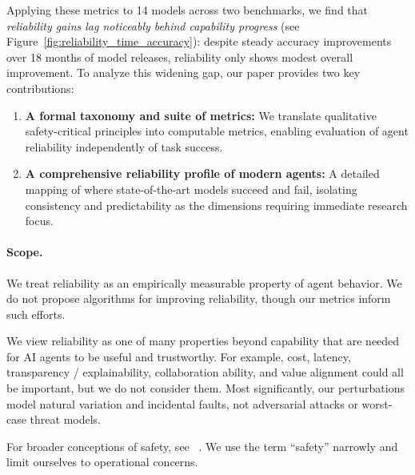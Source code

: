 \documentclass[11pt]{article}
\newcounter{dimension}
\begin{document}
Applying these metrics to 14 models across two benchmarks, we find that \textit{reliability gains lag noticeably behind capability progress} (see Figure~\ref{fig:reliability_time_accuracy}): despite steady accuracy improvements over 18 months of model releases, reliability only shows modest overall improvement. To analyze this widening gap, our paper provides two key contributions:
\begin{enumerate}[leftmargin=*]
  \item \textbf{A formal taxonomy and suite of metrics:} We translate qualitative safety-critical principles into computable metrics, enabling evaluation of agent reliability independently of task success.
  \item \textbf{A comprehensive reliability profile of modern agents:} A detailed mapping of where state-of-the-art  models succeed and fail, isolating consistency and predictability as the dimensions requiring immediate research focus.
\end{enumerate}
\paragraph{Scope.}
We treat reliability as an empirically measurable property of agent behavior. We do not propose algorithms for improving reliability, though our metrics inform such efforts.


We view reliability as one of many properties beyond capability that are needed for AI agents to be useful and trustworthy. For example, cost, latency, transparency / explainability, collaboration ability, and value alignment could all be important, but we do not consider them. Most significantly, our perturbations model natural variation and incidental faults, not adversarial attacks or worst-case threat models. %

For broader conceptions of safety, see ~\citep{everitt2018agi, hendrycks2021unsolved, weidinger2022taxonomy, weidinger2023sociotechnical, newman2023taxonomy, raji2023concrete}. We use the term ``safety'' narrowly and limit ourselves to operational concerns. 

\end{document}
